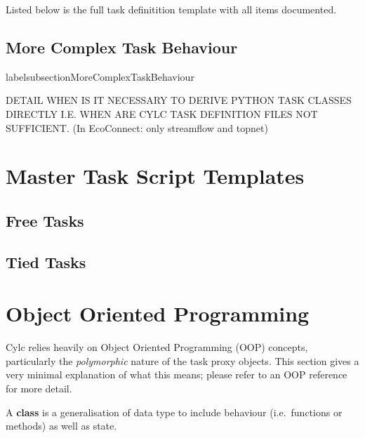 \documentclass[11pt,a4paper]{article}
\begin{document}
Listed below is the full task definitition template with all items
documented.

\lstset{language=cylctaskdef}



\lstset{language=}

\pagebreak
\subsection{More Complex Task Behaviour}
labelsubsection{MoreComplexTaskBehaviour}

DETAIL WHEN IS IT NECESSARY TO DERIVE PYTHON TASK CLASSES DIRECTLY
I.E. WHEN ARE CYLC TASK DEFINITION FILES NOT SUFFICIENT.
(In EcoConnect: only streamflow and topnet)

\pagebreak
\section{Master Task Script Templates}
\label{MasterTaskScriptTemplates}



\lstset{language=bash}

\pagebreak
\subsection{Free Tasks}


\pagebreak
\subsection{Tied Tasks}


\appendix

\pagebreak
\section{Object Oriented Programming}
\label{ObjectOrientedProgramming}

Cylc relies heavily on Object Oriented Programming (OOP) concepts,
particularly the {\em polymorphic} nature of the task proxy objects.
This section gives a very minimal explanation of what this means;
please refer to an OOP reference for more detail.

A {\bf class} is a generalisation of data type to include behaviour
(i.e.\ functions or methods) as well as state. 
\end{document}
